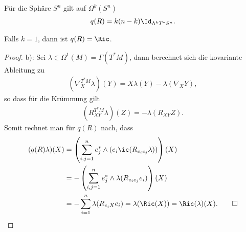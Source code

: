 \documentclass[%
	paper=a5,%
	fleqn,%
	DIV=18,%
	BCOR=0mm,
	fontsize=11pt,
	titlepage=false,%
	bibliography=totoc,
	DIV=18,%
	twoside=true,
	pdftitle=Riemannsche Geometrie,
	pdfauthor=Uwe Semmelmann,
	numbers=noendperiod]%
	{scrbook}
\begin{document}
\begin{lem}
\begin{propenum}
\item Für die Sphäre $S^n$ gilt auf $\Omega^k(S^n)$
\begin{align*}
q(R) = k(n-k)\Id_{\Lambda^kT^*S^n}.
\end{align*}
\item Falls $k=1$, dann ist $q(R) = \Ric$.\fish
\end{propenum}
\end{lem}
\begin{proof}
b): Sei $\lambda\in\Omega^1(M)=\Gamma(T^*M)$, dann berechnet sich die kovariante Ableitung zu
\begin{align*}
(\nabla_{X}^{T^*M}\lambda)(Y) = X\lambda(Y) - \lambda(\nabla_{X}Y),
\end{align*}
so dass für die Krümmung gilt
\begin{align*}
(R_{XY}^{T^*M}\lambda)(Z) = - \lambda(R_{XY}Z).
\end{align*}
Somit rechnet man für $q(R)$ nach, dass
\begin{align*}
(q(R)\lambda)(X) &= \left(\sum_{i,j=1}^n e_{j}^* \wedge (e_{i} \ic (R_{e_{i}e_{j}}\lambda) )\right)(X)\\
&= -\left(\sum_{i,j=1}^n e_{j}^* \wedge \lambda( R_{e_{i}e_{j}} e_{i} )\right)(X)\\
&= - \sum_{i=1}^n \lambda(R_{e_{i}X}e_{i}) = \lambda(\Ric(X)) = \Ric(\lambda)(X).\qed
\end{align*}
\end{proof}
\end{document}
